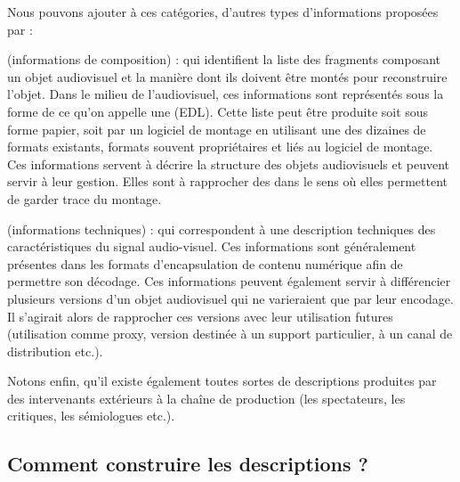 Nous pouvons ajouter à ces catégories, d'autres types d'informations proposées par \cite{Rayers2002} : 
\begin{liste} 
	\item {} (informations de composition) : qui identifient la liste des fragments composant un objet audiovisuel et la manière dont ils doivent être montés pour reconstruire l'objet. 
	Dans le milieu de l'audiovisuel, ces informations sont représentés sous la forme de ce qu'on appelle une  (EDL).
	Cette liste peut être produite soit sous forme papier, soit par un logiciel de montage en utilisant une des dizaines de formats existants, formats souvent propriétaires et liés au logiciel de montage. 
	Ces informations servent à décrire la structure des objets audiovisuels et peuvent servir à leur gestion.
	Elles sont à rapprocher des  dans le sens où elles permettent de garder trace du montage. 


	\item {} (informations techniques) : qui correspondent à une description techniques des caractéristiques du signal audio-visuel. 
	Ces informations sont généralement présentes dans les formats d'encapsulation de contenu numérique afin de permettre son décodage.
	Ces informations peuvent également servir à différencier plusieurs versions d'un objet audiovisuel qui ne varieraient que par leur encodage. 
	Il s'agirait alors de rapprocher ces versions avec leur utilisation futures (utilisation comme proxy, version destinée à un support particulier, à un canal de distribution etc.).
\end{liste}


Notons enfin, qu'il existe également toutes sortes de descriptions produites par des intervenants extérieurs à la chaîne de production (les spectateurs, les critiques, les sémiologues etc.).



\subsection{Comment construire les descriptions ?} 
